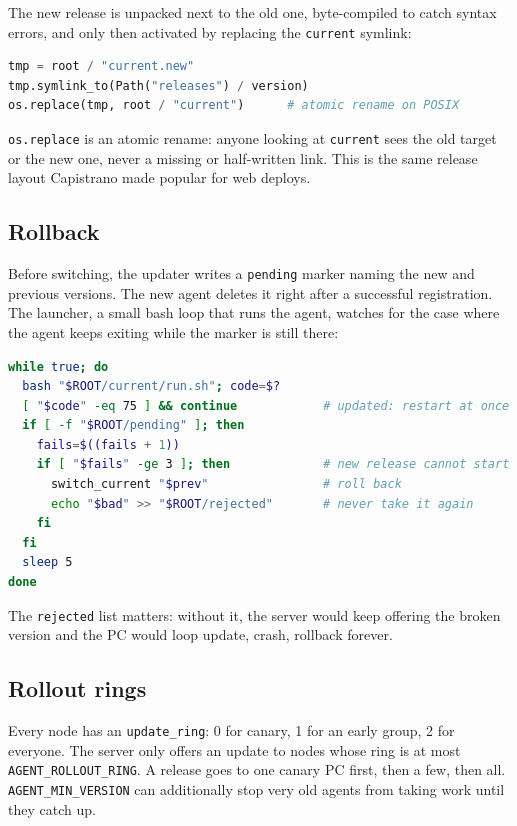 The new release is unpacked next to the old one, byte-compiled to catch syntax
errors, and only then activated by replacing the \texttt{current} symlink:

\begin{lstlisting}[language=Python]
tmp = root / "current.new"
tmp.symlink_to(Path("releases") / version)
os.replace(tmp, root / "current")      # atomic rename on POSIX
\end{lstlisting}

\texttt{os.replace} is an atomic rename: anyone looking at \texttt{current}
sees the old target or the new one, never a missing or half-written link. This
is the same release layout Capistrano made popular for web deploys.

\subsection{Rollback}

Before switching, the updater writes a \texttt{pending} marker naming the new
and previous versions. The new agent deletes it right after a successful
registration. The launcher, a small bash loop that runs the agent, watches for
the case where the agent keeps exiting while the marker is still there:

\begin{lstlisting}[language=bash]
while true; do
  bash "$ROOT/current/run.sh"; code=$?
  [ "$code" -eq 75 ] && continue            # updated: restart at once
  if [ -f "$ROOT/pending" ]; then
    fails=$((fails + 1))
    if [ "$fails" -ge 3 ]; then             # new release cannot start
      switch_current "$prev"                # roll back
      echo "$bad" >> "$ROOT/rejected"       # never take it again
    fi
  fi
  sleep 5
done
\end{lstlisting}

The \texttt{rejected} list matters: without it, the server would keep offering
the broken version and the PC would loop update, crash, rollback forever.

\subsection{Rollout rings}

Every node has an \texttt{update\_ring}: 0 for canary, 1 for an early group, 2
for everyone. The server only offers an update to nodes whose ring is at most
\texttt{AGENT\_ROLLOUT\_RING}. A release goes to one canary PC first, then a few,
then all. \texttt{AGENT\_MIN\_VERSION} can additionally stop very old agents
from taking work until they catch up.

